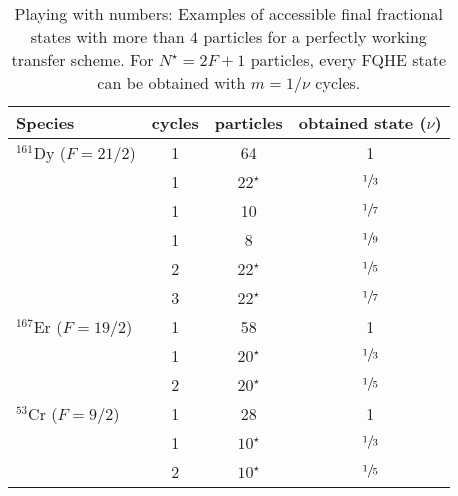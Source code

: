 \begin{table}[t]
    \centering
    \begin{tabular}{lccc}
    \toprule
    Species & cycles & particles & obtained state ($\nu$) \\
    \midrule
    $^{161}\text{Dy}$ ($F=21/2$) & 1 & 64 & 1 \\
    & 1 & $22^\star$ & $\sfrac{1}{3}$ \\
    & 1 & 10 & $\sfrac{1}{7}$ \\
    & 1 & 8 & $\sfrac{1}{9}$ \\
    & 2 & $22^\star$ & $\sfrac{1}{5}$ \\
    & 3 & $22^\star$ & $\sfrac{1}{7}$ \\
    \midrule
    $^{167}\text{Er}$ ($F=19/2$) & 1 & 58 & 1 \\
    & 1 & $20^\star$ & $\sfrac{1}{3}$ \\
    & 2 & $20^\star$ & $\sfrac{1}{5}$ \\
    \midrule
    $^{53}\text{Cr}$ ($F=9/2$) & 1 & 28 & 1 \\
    & 1 & $10^\star$ & $\sfrac{1}{3}$ \\
    & 2 & $10^\star$ & $\sfrac{1}{5}$ \\
    \bottomrule
    \end{tabular}
    \caption{Playing with numbers: Examples of accessible final fractional states with more than $4$ particles for a perfectly working transfer scheme. For $N^\star=2F+1$ particles, every FQHE state can be obtained with $m=1/\nu$ cycles.}
\end{table}


